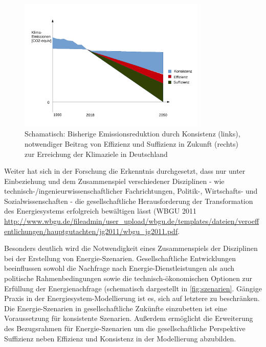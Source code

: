 \documentclass[a4paper,11pt,twoside]{scrartcl}
\begin{document}
\begin{figure}[!h]
    \centering
    \includegraphics[width=0.8\textwidth]{figures/Zusammenspiel.pdf}
    \caption{Schamatisch: Bisherige Emissionsreduktion durch Konsistenz (links), notwendiger Beitrag von Effizienz und Suffizienz in Zukunft (rechts) zur Erreichung der Klimaziele in Deutschland}
    \label{fig:zusammenspiel}
\end{figure}

Weiter hat sich in der Forschung die Erkenntnis durchgesetzt, dass nur unter Einbeziehung und dem Zusammenspiel verschiedener Disziplinen - wie technisch-/ingenieurwissenschaftlicher Fachrichtungen, Politik-, Wirtschafts- und Sozialwissenschaften - die gesellschaftliche Herausforderung der Transformation des Energiesystems erfolgreich bewältigen lässt (WBGU 2011 \url{http://www.wbgu.de/fileadmin/user_upload/wbgu.de/templates/dateien/veroeffentlichungen/hauptgutachten/jg2011/wbgu_jg2011.pdf}.

Besonders deutlich wird die Notwendigkeit eines Zusammenspiels der Disziplinen bei der Erstellung von Energie-Szenarien. Gesellschaftliche Entwicklungen beeinflussen sowohl die Nachfrage nach Energie-Dienstleistungen als auch politische Rahmenbedingungen sowie die technisch-ökonomischen Optionen zur Erfüllung der Energienachfrage (schematisch dargestellt in \ref{fig:szenarien}. Gängige Praxis in der Energiesystem-Modellierung ist es, sich auf letztere zu beschränken. Die Energie-Szenarien in gesellschaftliche Zukünfte einzubetten ist eine Voraussetzung für konsistente Szenarien. Außerdem ermöglicht die Erweiterung des Bezugsrahmen für Energie-Szenarien um die gesellschaftliche Perspektive Suffizienz neben Effizienz und Konsistenz in der Modellierung abzubilden. 
\end{document}
